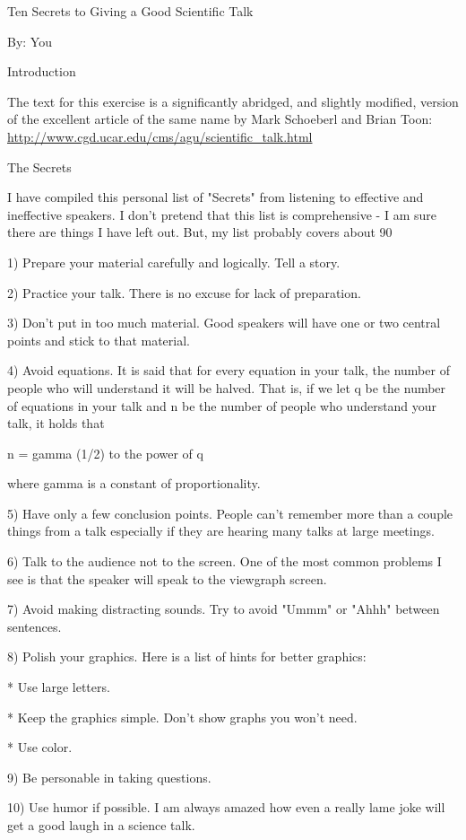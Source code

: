 \documentclass[12pt]{article}
\begin{document}
Ten Secrets to Giving a Good Scientific Talk

By: You

Introduction

The text for this exercise is a significantly abridged, and slightly modified, version of the excellent article of the same name by Mark Schoeberl and Brian Toon:
\url{http://www.cgd.ucar.edu/cms/agu/scientific_talk.html}

The Secrets

I have compiled this personal list of "Secrets" from listening to effective and ineffective speakers. I don't pretend that this list is comprehensive - I am sure there are things I have left out. But, my list probably covers about 90%

1) Prepare your material carefully and logically. Tell a story.

2) Practice your talk. There is no excuse for lack of preparation.

3) Don't put in too much material. Good speakers will have one or two central points and stick to that material.

4) Avoid equations. It is said that for every equation in your talk, the number of people who will understand it will be halved. That is, if we let q be the number of equations in your talk and n be the number of people who understand your talk, it holds that

n = gamma (1/2) to the power of q

where gamma is a constant of proportionality.

5) Have only a few conclusion points. People can't remember more than a couple things from a talk especially if they are hearing many talks at large meetings.

6) Talk to the audience not to the screen. One of the most common problems I see is that the speaker will speak to the viewgraph screen.

7) Avoid making distracting sounds. Try to avoid "Ummm" or "Ahhh" between sentences.

8) Polish your graphics. Here is a list of hints for better graphics:

* Use large letters.

* Keep the graphics simple. Don't show graphs you won't need.

* Use color.

9) Be personable in taking questions.

10) Use humor if possible. I am always amazed how even a really lame joke will get a good laugh in a science talk.
\end{document}
